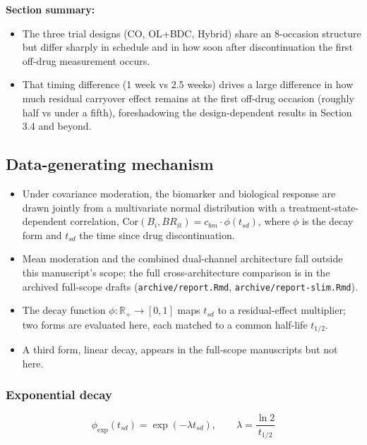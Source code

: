 \documentclass[
  11pt,
]{article}
\providecommand{\tightlist}{%
  \setlength{\itemsep}{0pt}\setlength{\parskip}{0pt}}
\begin{document}
\textbf{Section summary:}

\begin{itemize}
\tightlist
\item
  The three trial designs (CO, OL+BDC, Hybrid) share an 8-occasion
  structure but differ sharply in schedule and in how soon after
  discontinuation the first off-drug measurement occurs.
\item
  That timing difference (1 week vs 2.5 weeks) drives a large
  difference in how much residual carryover effect remains at the
  first off-drug occasion (roughly half vs under a fifth),
  foreshadowing the design-dependent results in Section 3.4 and
  beyond.
\end{itemize}

\subsection{Data-generating mechanism}\label{data-generating-mechanism}

\begin{itemize}
\tightlist
\item
  Under covariance moderation, the biomarker and biological response
  are drawn jointly from a multivariate normal distribution with a
  treatment-state-dependent correlation,
  \(\text{Cor}(B_i, BR_{it}) = c_{bm} \cdot \phi(t_{sd})\), where \(\phi\)
  is the decay form and \(t_{sd}\) the time since drug discontinuation.
\item
  Mean moderation and the combined dual-channel architecture fall
  outside this manuscript's scope; the full cross-architecture
  comparison is in the archived full-scope drafts
  (\texttt{archive/report.Rmd}, \texttt{archive/report-slim.Rmd}).
\item
  The decay function \(\phi : \mathbb{R}_+ \to [0, 1]\) maps \(t_{sd}\) to
  a residual-effect multiplier; two forms are evaluated here, each
  matched to a common half-life \(t_{1/2}\).
\item
  A third form, linear decay, appears in the full-scope manuscripts
  but not here.
\end{itemize}

\subsubsection{Exponential decay}\label{exponential-decay}

\[
\phi_{\text{exp}}(t_{sd}) =
  \exp\left(-\lambda t_{sd}\right), \qquad
  \lambda = \frac{\ln 2}{t_{1/2}}
\]
\end{document}
